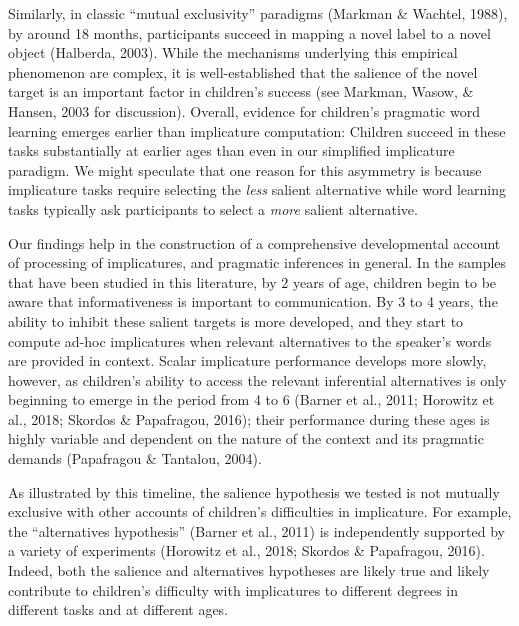 \documentclass[mask,man]{apa6}
\begin{document}
Similarly, in classic \enquote{mutual exclusivity} paradigms (Markman \&
Wachtel, 1988), by around 18 months, participants succeed in mapping a
novel label to a novel object (Halberda, 2003). While the mechanisms
underlying this empirical phenomenon are complex, it is well-established
that the salience of the novel target is an important factor in
children's success (see Markman, Wasow, \& Hansen, 2003 for discussion).
Overall, evidence for children's pragmatic word learning emerges earlier
than implicature computation: Children succeed in these tasks
substantially at earlier ages than even in our simplified implicature
paradigm. We might speculate that one reason for this asymmetry is
because implicature tasks require selecting the \emph{less} salient
alternative while word learning tasks typically ask participants to
select a \emph{more} salient alternative.

Our findings help in the construction of a comprehensive developmental
account of processing of implicatures, and pragmatic inferences in
general. In the samples that have been studied in this literature, by 2
years of age, children begin to be aware that informativeness is
important to communication. By 3 to 4 years, the ability to inhibit
these salient targets is more developed, and they start to compute
ad-hoc implicatures when relevant alternatives to the speaker's words
are provided in context. Scalar implicature performance develops more
slowly, however, as children's ability to access the relevant
inferential alternatives is only beginning to emerge in the period from
4 to 6 (Barner et al., 2011; Horowitz et al., 2018; Skordos \&
Papafragou, 2016); their performance during these ages is highly
variable and dependent on the nature of the context and its pragmatic
demands (Papafragou \& Tantalou, 2004).

As illustrated by this timeline, the salience hypothesis we tested is
not mutually exclusive with other accounts of children's difficulties in
implicature. For example, the \enquote{alternatives hypothesis} (Barner
et al., 2011) is independently supported by a variety of experiments
(Horowitz et al., 2018; Skordos \& Papafragou, 2016). Indeed, both the
salience and alternatives hypotheses are likely true and likely
contribute to children's difficulty with implicatures to different
degrees in different tasks and at different ages.
\end{document}
